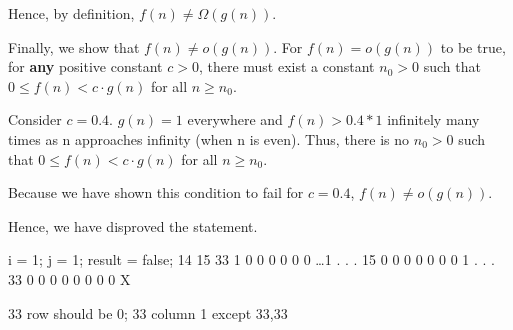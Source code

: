 \documentclass[a4paper]{report}
\begin{document}
\begin{enumerate}
      Hence, by definition, $f(n) \neq \Omega(g(n))$. 
      
      Finally, we show that $f(n) \neq o(g(n))$.
      For $f(n) = o(g(n))$ to be true, for {\bf any} positive constant $c > 0$, there must exist a constant $n_{0} > 0$ such that
      $0 \leq f(n) < c \cdot g(n)$ for all $n \geq n_{0}$. 

      Consider $c = 0.4$. $g(n) = 1$ everywhere and $f(n) > 0.4 * 1$ infinitely many times as n approaches infinity 
      (when n is even). Thus, there is no $n_{0} > 0 $ such that $0 \leq f(n) < c \cdot g(n)$ for all $n \geq n_{0}$.  
      
      Because we have shown this condition to fail for $c = 0.4$, $f(n) \neq o(g(n))$.

      Hence, we have disproved the statement.

  \end{enumerate}

  
  i = 1; j = 1; result = false;
                 14   15            33
  1 0 0 0 0 0 0 \dots 1
  .
  .
  .
  15                  0 0 0 0 0 0 0 1
  .
  .
  .
  33                                0 0 0 0 0 0 0 0 X

  33 row should be 0; 33 column 1 except 33,33






















































  
\end{document}
